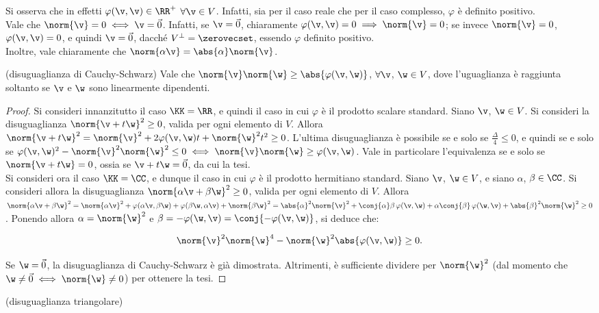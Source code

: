 \documentclass[11pt]{article}
\begin{document}
	\begin{remark}\nl
		\li Si osserva che in effetti $\varphi(\v, \v) \in \RR^+$ $\forall \v \in V$. Infatti, sia
		per il caso reale che per il caso complesso, $\varphi$ è definito positivo. \\
		\li Vale che $\norm{\v} = 0 \iff \v = \vec 0$. Infatti, se $\v = \vec 0$, chiaramente
		$\varphi(\v, \v) = 0 \implies \norm{\v} = 0$; se invece $\norm{\v} = 0$,
		$\varphi(\v, \v) = 0$, e quindi $\v = \vec 0$, dacché $V^\perp = \zerovecset$, essendo
		$\varphi$ definito positivo. \\
		\li Inoltre, vale chiaramente che $\norm{\alpha \v} = \abs{\alpha} \norm{\v}$.
	\end{remark}

	\begin{proposition} (disuguaglianza di Cauchy-Schwarz)
		Vale che $\norm{\v} \norm{\w} \geq \abs{\varphi(\v, \w)}$, $\forall \v$, $\w \in V$, dove
		l'uguaglianza è raggiunta soltanto se $\v$ e $\w$ sono linearmente dipendenti.
	\end{proposition}

	\begin{proof}
		Si consideri innanzitutto il caso $\KK = \RR$, e quindi il caso in cui $\varphi$ è
		il prodotto scalare standard. Siano $\v$, $\w \in V$.
		Si consideri la disuguaglianza $\norm{\v + t\w}^2 \geq 0$, valida
		per ogni elemento di $V$. Allora $\norm{\v + t \w}^2 = \norm{\v}^2 + 2 \varphi(\v, \w) t + \norm{\w}^2 t^2 \geq 0$. L'ultima disuguaglianza è possibile se e solo se $\frac{\Delta}{4} \leq 0$, e quindi se e solo
		se $\varphi(\v, \w)^2 - \norm{\v}^2 \norm{\w}^2 \leq 0 \iff \norm{\v} \norm{\w} \geq \varphi(\v, \w)$.
		Vale in particolare l'equivalenza se e solo se $\norm{\v + t\w} = 0$, ossia se $\v + t\w = \vec 0$, da cui
		la tesi. \\
		
		Si consideri ora il caso $\KK = \CC$, e dunque il caso in cui $\varphi$ è il prodotto hermitiano
		standard. Siano $\v$, $\w \in V$, e siano $\alpha$, $\beta \in \CC$. Si consideri allora
		la disuguaglianza $\norm{\alpha \v + \beta \w}^2 \geq 0$, valida per ogni elemento di $V$. Allora
		$\norm{\alpha \v + \beta \w}^2 = \norm{\alpha \v}^2 + \varphi(\alpha \v, \beta \w) + \varphi(\beta \w, \alpha \v) + \norm{\beta \w}^2 = \abs{\alpha}^2 \norm{\v}^2 + \conj{\alpha} \beta \, \varphi(\v, \w) +
		\alpha \conj{\beta} \, \varphi(\w, \v) + \abs{\beta}^2 \norm{\w}^2 \geq 0$. Ponendo allora
		$\alpha = \norm{\w}^2$ e $\beta = -\varphi(\w, \v) = \conj{-\varphi(\v, \w)}$, si deduce che:
		
		\[ \norm{\v}^2 \norm{\w}^4 - \norm{\w}^2 \abs{\varphi(\v, \w)} \geq 0. \]
		
		\vskip 0.05in
		
		Se $\w = \vec 0$, la disuguaglianza di Cauchy-Schwarz è già dimostrata. Altrimenti, è sufficiente
		dividere per $\norm{\w}^2$ (dal momento che $\w \neq \vec 0 \iff \norm{\w} \neq 0$) per ottenere
		la tesi.
	\end{proof}

	\begin{proposition} (disuguaglianza triangolare)
		
	\end{proposition}
\end{document}
